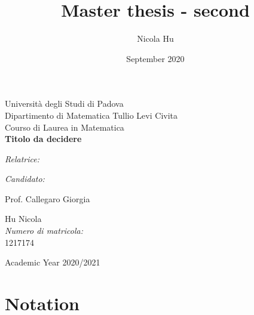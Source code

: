 \documentclass[a4paper,italian,11pt]{book}
\title{Master thesis - second}
\author{Nicola Hu}
\date{September 2020}
\newcommand{\facciatabianca}{\newpage\shipout\null\stepcounter{page}}
\theoremstyle{plain}
\theoremstyle{remark}
\theoremstyle{plain}
\begin{document}
\begin{titlepage}
\begin{figure} [h]
\begin{center}
\end{center}
\end{figure}
\begin{center}
{\Large Universit\`a degli Studi di Padova\\}
\vspace{8mm} 
{\Large Dipartimento di Matematica Tullio Levi Civita\\}
\vspace{8mm}
{\Large Courso di Laurea in Matematica\\}
\vspace{10mm}
{\LARGE \textbf{Titolo da decidere}\\}	

\vspace{30mm}
\end{center}
\par
\begin{minipage}[t]{0.5\textwidth}
{\Large \textit{Relatrice:}}
\end{minipage}
\hfill
\begin{minipage}[t]{0.5\textwidth} \raggedleft
{\Large \textit{Candidato: }}
\end{minipage}
\par
\vspace{1mm}
\begin{minipage}[t]{0.5\textwidth}
{\Large Prof. Callegaro Giorgia}
\end{minipage}
\hfill
\begin{minipage}[t]{0.5\textwidth} \raggedleft
{\Large Hu Nicola \\ \textit{Numero di matricola:} \\ 1217174\\}%
\end{minipage}
\vspace{25mm}
\begin{center}
{\large{
Academic Year 2020/2021}}
\end{center}
\end{titlepage}


\facciatabianca


\newpage
\tableofcontents
\pagestyle{headings}

\newpage

\section*{Notation}
\end{document}
